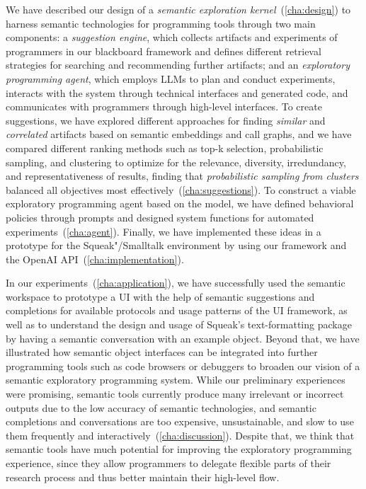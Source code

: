 We have described our design of a \emph{semantic exploration kernel}~(\cref{cha:design}) to harness semantic technologies for programming tools through two main components:
a \emph{suggestion engine}, which collects artifacts and experiments of programmers in our blackboard framework and defines different retrieval strategies for searching and recommending further artifacts;
and an \emph{exploratory programming agent}, which employs LLMs to plan and conduct experiments, interacts with the system through technical interfaces and generated code, and communicates with programmers through high-level interfaces.
To create suggestions, we have explored different approaches for finding \emph{similar} and \emph{correlated} artifacts based on semantic embeddings and call graphs, and we have compared different ranking methods such as top-k selection, probabilistic sampling, and clustering to optimize for the relevance, diversity, irredundancy, and representativeness of results, finding that \emph{probabilistic sampling from clusters} balanced all objectives most effectively~(\cref{cha:suggestions}).
To construct a viable exploratory programming agent based on the \gptfouro model, we have defined behavioral policies through prompts and designed system functions for automated experiments~(\cref{cha:agent}).
Finally, we have implemented these ideas in a prototype for the Squeak"/Smalltalk environment by using our \semtex framework and the OpenAI API~(\cref{cha:implementation}).

In our experiments~(\cref{cha:application}), we have successfully used the semantic workspace to prototype a UI with the help of semantic suggestions and completions for available protocols and usage patterns of the UI framework, as well as to understand the design and usage of Squeak's text-formatting package by having a semantic conversation with an example object.
Beyond that, we have illustrated how semantic object interfaces can be integrated into further programming tools such as code browsers or debuggers to broaden our vision of a semantic exploratory programming system.
While our preliminary experiences were promising, semantic tools currently produce many irrelevant or incorrect outputs due to the low accuracy of semantic technologies, and semantic completions and conversations are too expensive, unsustainable, and slow to use them frequently and interactively~(\cref{cha:discussion}).
Despite that, we think that semantic tools have much potential for improving the exploratory programming experience, since they allow programmers to delegate flexible parts of their research process and thus better maintain their high-level flow.

